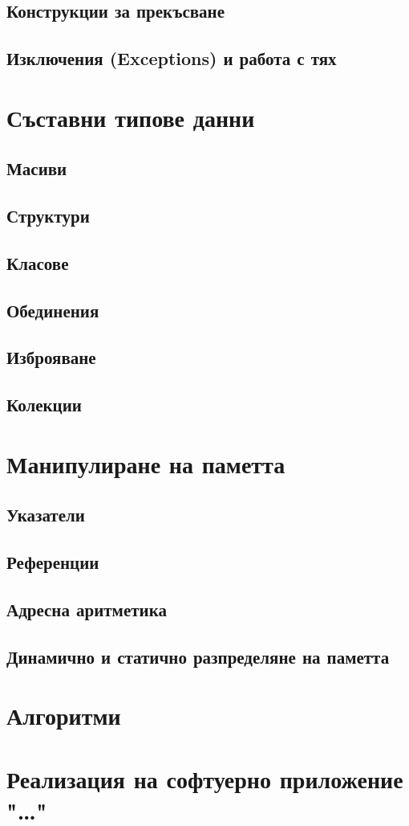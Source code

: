 \documentclass[oneside]{book}
\begin{document}
\section{Конструкции за прекъсване}
\section{Изключения (Exceptions) и работа с тях}\label{sec:exceptions}

\chapter{Съставни типове данни}
\section{Масиви}\label{sec:array}
\section{Структури}
\section{Класове}
\section{Обединения}
\section{Изброяване}
\section{Колекции}

\chapter{Манипулиране на паметта}
\section{Указатели}
\section{Референции}
\section{Адресна аритметика}
\section{Динамично и статично разпределяне на паметта}

\chapter{Алгоритми}

\chapter*{Реализация на софтуерно приложение "\dots"}
\end{document}
